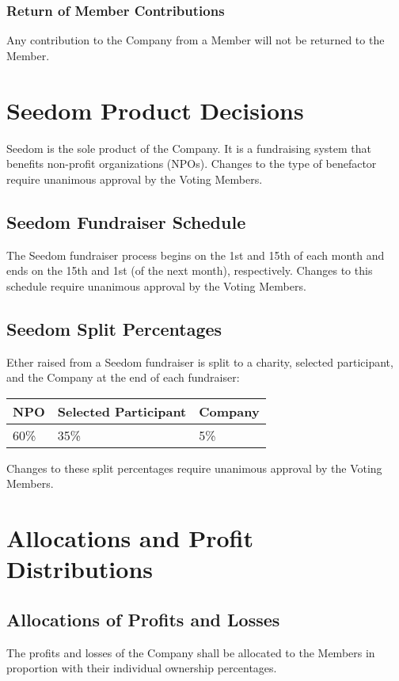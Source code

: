 \documentclass[11pt]{article}
\begin{document}
\subsubsection{Return of Member Contributions}
Any contribution to the Company from a Member will not be returned to the Member.

\section{Seedom Product Decisions}
Seedom is the sole product of the Company. It is a fundraising system that benefits non-profit organizations (NPOs). Changes to the type of benefactor require unanimous approval by the Voting Members.

\subsection{Seedom Fundraiser Schedule}
\label{sec:seedomFundraiserSchedule}
The Seedom fundraiser process begins on the 1st and 15th of each month and ends on the 15th and 1st (of the next month), respectively. Changes to this schedule require unanimous approval by the Voting Members.

\subsection{Seedom Split Percentages}
\label{sec:seedomSplitPercentages}
Ether raised from a Seedom fundraiser is split to a charity, selected participant, and the Company at the end of each fundraiser:
\begin{table}[H]
\begin{center}
\begin{tabular}{| l | l | l |}
\hline
\textbf{NPO} & \textbf{Selected Participant} & \textbf{Company} \\ \hline
60\% & 35\%  & 5\% \\ \hline
\end{tabular}
\end{center}
\end{table}
Changes to these split percentages require unanimous approval by the Voting Members.

\section{Allocations and Profit Distributions}

\subsection{Allocations of Profits and Losses}
The profits and losses of the Company shall be allocated to the Members in proportion with their individual ownership percentages.
\end{document}
